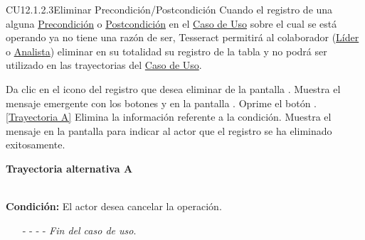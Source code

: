 	\begin{UseCase}{CU12.1.2.3}{Eliminar Precondición/Postcondición}{
			Cuando el registro de una  alguna \hyperlink{entidadPrecondicion}{Precondición} o \hyperlink{entidadPostcondicion}{Postcondición} en el \hyperlink{casoUso}{Caso de Uso} sobre el cual se está operando ya no tiene una razón de ser, Tesseract permitirá al colaborador (\hyperlink{jefe}{Líder} o \hyperlink{analista}{Analista}) eliminar en su totalidad su registro de la tabla y no podrá ser utilizado en las trayectorias del \hyperlink{casoUso}{Caso de Uso}.
	}
\end{UseCase}
\begin{UCtrayectoria}
	\UCpaso[\UCactor] Da clic en el icono \eliminar del registro que desea eliminar de la pantalla .
	\UCpaso[\UCsist] Muestra el mensaje emergente  con los botones  y  en la pantalla .
	\UCpaso[\UCactor] Oprime el botón . \hyperlink{CU12-1-2-3:TAA}{[Trayectoria A]}
	\UCpaso[\UCsist] Elimina la información referente a la condición.
	\UCpaso[\UCsist] Muestra el mensaje  en la pantalla  para indicar al actor que el registro se ha eliminado exitosamente.
\end{UCtrayectoria}		
\hypertarget{CU12-1-2-3:TAA}{\textbf{Trayectoria alternativa A}}\\
\noindent \textbf{Condición:} El actor desea cancelar la operación.
\begin{enumerate}
	\UCpaso[\UCactor] Solicita cancelar la operación oprimiendo el botón  de la pantalla .
	\UCpaso[\UCsist] Muestra la pantalla .
	\item[- -] - - {\em {Fin del caso de uso}}.%
\end{enumerate}



